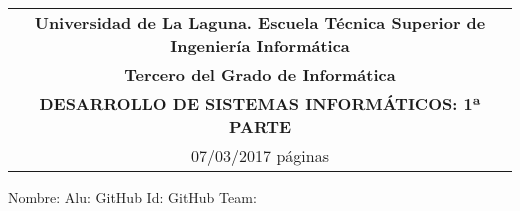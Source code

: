 \documentclass[]{article}
\date{}
\begin{document}
\thispagestyle{empty}
  \begin{tabular}{c}
   {\bf Universidad de La Laguna.  Escuela Técnica Superior de Ingeniería Informática}     \\
   {\bf Tercero del Grado de Informática}\\
   {\bf DESARROLLO DE SISTEMAS INFORMÁTICOS: 1ª PARTE}\\
   07/03/2017  \pageref*{LastPage} páginas         \\   
  \end{tabular}                     %

\bigskip

Nombre:  \underline{\hspace{10.5cm}} 
Alu: \underline{\hspace{2cm}} 
GitHub Id: \underline{\hspace{2cm}} 
GitHub Team: \underline{\hspace{2cm}} 
\bigskip













%

%





%

%
\end{document}
